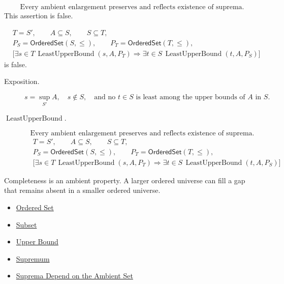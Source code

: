 \begin{remark*}
\[
\text{Every ambient enlargement preserves and reflects existence of suprema.}
\]
This assertion is false.
\end{remark*}

\begin{remark*}
\[
\begin{aligned}
&T=S',\qquad A\subseteq S,\qquad S\subseteq T,\\
&P_S=\mathsf{OrderedSet}(S,\leq),\qquad
P_T=\mathsf{OrderedSet}(T,\leq),\\
&\bigl[\exists s\in T\,\operatorname{LeastUpperBound}(s,A,P_T)
\Longrightarrow
\exists t\in S\,\operatorname{LeastUpperBound}(t,A,P_S)\bigr]
\end{aligned}
\]
is false.
\end{remark*}

\begin{remark*}
\begin{description}
  \item[Exposition.]
\[
s=\sup_{S'} A,\quad s\notin S,\quad
\text{and no }t\in S\text{ is least among the upper bounds of }A\text{ in }S.
\]


  \item[\(\operatorname{LeastUpperBound}.\)]
  \[
\text{Every ambient enlargement preserves and reflects existence of suprema.}
\]
\[
\begin{aligned}
&T=S',\qquad A\subseteq S,\qquad S\subseteq T,\\
&P_S=\mathsf{OrderedSet}(S,\leq),\qquad
P_T=\mathsf{OrderedSet}(T,\leq),\\
&\bigl[\exists s\in T\,\operatorname{LeastUpperBound}(s,A,P_T)
\Longrightarrow
\exists t\in S\,\operatorname{LeastUpperBound}(t,A,P_S)\bigr]
\end{aligned}
\]
\end{description}
\end{remark*}

\begin{remark*}[Interpretation]
Completeness is an ambient property. A larger ordered universe can fill a gap that remains absent in a smaller ordered universe.
\end{remark*}

\begin{dependencies}
\begin{itemize}
  \item \hyperref[def:ordered-set]{Ordered Set}
  \item \hyperref[def:subset]{Subset}
  \item \hyperref[def:real-upper-bound]{Upper Bound}
  \item \hyperref[def:supremum]{Supremum}
  \item \hyperref[prop:suprema-ambient-set]{Suprema Depend on the Ambient Set}
\end{itemize}
\end{dependencies}



